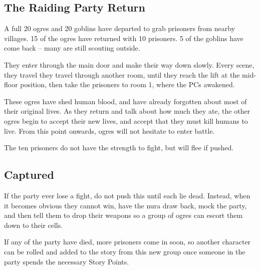 \begin{multicols}{2}


\subsection{The Raiding Party Return}

A full 20 ogres and 20 goblins have departed to grab prisoners from nearby villages.
15 of the ogres have returned with 10 prisoners.
5 of the goblins have come back -- many are still scouting outside.

They enter through the main door and make their way down slowly.
Every scene, they travel they travel through another room, until they reach the lift at the mid-floor position, then take the prisoners to room 1, where the PCs awakened.

These ogres have shed human blood, and have already forgotten about most of their original lives.
As they return and talk about how much they ate, the other ogres begin to accept their new lives, and accept that they must kill humans to live.
From this point onwards, ogres will not hesitate to enter battle.




The ten prisoners do not have the strength to fight, but will flee if pushed.

\subsection{Captured}

If the party ever lose a fight, do not push this until each lie dead.
Instead, when it becomes obvious they cannot win, have the nura draw back, mock the party, and then tell them to drop their weapons so a group of ogres can escort them down to their cells.

If any of the party have died, more prisoners come in soon, so another character can be rolled and added to the story from this new group once someone in the party spends the necessary Story Points.

\end{multicols}
